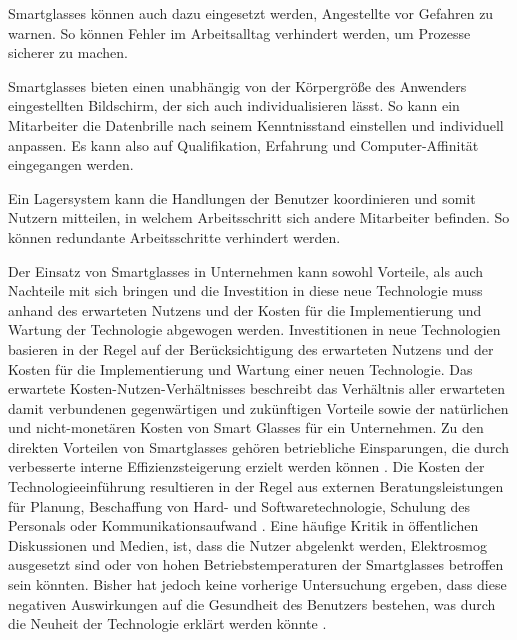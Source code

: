 Smartglasses können auch dazu eingesetzt werden, Angestellte vor Gefahren zu warnen. So können Fehler im Arbeitsalltag verhindert werden, um Prozesse sicherer zu machen. 
%

Smartglasses bieten einen unabhängig von der Körpergröße des Anwenders eingestellten Bildschirm, der sich auch individualisieren lässt. So kann ein Mitarbeiter die Datenbrille nach seinem Kenntnisstand einstellen und individuell anpassen. Es kann also auf Qualifikation, Erfahrung und Computer-Affinität eingegangen werden.

Ein Lagersystem kann die Handlungen der Benutzer koordinieren und somit Nutzern mitteilen, in welchem Arbeitsschritt sich andere Mitarbeiter befinden. So können redundante Arbeitsschritte verhindert werden. 
%

Der Einsatz von Smartglasses in Unternehmen kann sowohl Vorteile, als auch Nachteile mit sich bringen und die Investition in diese neue Technologie muss anhand des erwarteten Nutzens und der Kosten für die Implementierung und Wartung der Technologie abgewogen werden. Investitionen in neue Technologien basieren in der Regel auf der Berücksichtigung des erwarteten Nutzens und der Kosten für die Implementierung und Wartung einer neuen Technologie. Das erwartete Kosten-Nutzen-Verhältnisses beschreibt das Verhältnis aller erwarteten damit verbundenen gegenwärtigen und zukünftigen Vorteile sowie der natürlichen und nicht-monetären Kosten von Smart Glasses für ein Unternehmen. Zu den direkten Vorteilen von Smartglasses gehören betriebliche Einsparungen, die durch verbesserte interne Effizienzsteigerung erzielt werden können \cite{Hein2016}.
Die Kosten der Technologieeinführung resultieren in der Regel aus externen Beratungsleistungen für Planung, Beschaffung von Hard- und Softwaretechnologie, Schulung des Personals oder Kommunikationsaufwand \cite{Hein2016}. Eine häufige Kritik in öffentlichen Diskussionen und Medien, ist, dass die Nutzer abgelenkt werden, Elektrosmog ausgesetzt sind oder von hohen Betriebstemperaturen der Smartglasses betroffen sein könnten. Bisher hat jedoch keine vorherige Untersuchung ergeben, dass diese negativen Auswirkungen auf die Gesundheit des Benutzers bestehen, was durch die Neuheit der Technologie erklärt werden könnte \cite{Hein2016}.
%
%
%
%
%
%
